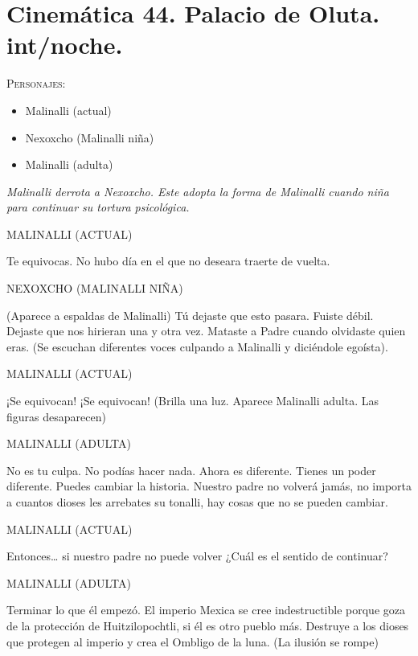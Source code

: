 \documentclass[11pt,letterpaper]{article}
\begin{document}
\section{Cinemática 44. Palacio de Oluta. int/noche. }
 \textsc{Personajes}:
 \begin{itemize}
 \item Malinalli (actual)
\item Nexoxcho (Malinalli niña)
\item Malinalli (adulta)
 \end{itemize}
\textit{Malinalli derrota a Nexoxcho. Este adopta la forma de Malinalli cuando niña para continuar su tortura psicológica.}
\begin{center}
MALINALLI (ACTUAL)
\\
\par 
Te equivocas. No hubo día en el que no deseara traerte de vuelta. 
\\
\par 
NEXOXCHO (MALINALLI NIÑA) 
\\
\par 
(Aparece a espaldas de Malinalli) Tú dejaste que esto pasara. Fuiste débil. Dejaste que nos hirieran una y otra vez. Mataste a Padre cuando olvidaste quien eras.
(Se escuchan diferentes voces culpando a Malinalli y diciéndole egoísta).
\\
\par 
MALINALLI (ACTUAL)
\\
\par 
¡Se equivocan! ¡Se equivocan!
(Brilla una luz. Aparece Malinalli adulta. Las figuras desaparecen)
\\
\par 
MALINALLI (ADULTA)
\\
\par 
No es tu culpa. No podías hacer nada. Ahora es diferente. Tienes un poder diferente. Puedes cambiar la historia. Nuestro padre no volverá jamás, no importa a cuantos dioses les arrebates su tonalli, hay cosas que no se pueden cambiar.
\\
\par 
MALINALLI (ACTUAL)
\\
\par 
Entonces… si nuestro padre no puede volver ¿Cuál es el sentido de continuar?
\\
\par 
MALINALLI (ADULTA)
\\
\par 
Terminar lo que él empezó. El imperio Mexica se cree indestructible porque goza de la protección de Huitzilopochtli, si él es otro pueblo más. Destruye a los dioses que protegen al imperio y crea el Ombligo de la luna.
(La ilusión se rompe) 
\end{center}
\end{document}
